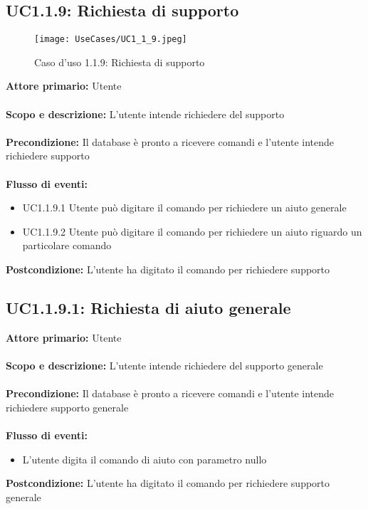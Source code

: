 \documentclass{scalatekids-article}
\begin{document}
\subsection{UC1.1.9: Richiesta di supporto}
\begin{figure}[H]
  \texttt{[image: UseCases/UC1\_1\_9.jpeg]}
  \caption{Caso d'uso 1.1.9: Richiesta di supporto}
\end{figure}
\textbf{Attore primario:} Utente \\ \\
\textbf{Scopo e descrizione:} L’utente intende richiedere del supporto\\ \\
\textbf{Precondizione:} Il database è pronto a ricevere comandi e l’utente intende richiedere supporto\\ \\
\textbf{Flusso di eventi:}
\begin{itemize}
\item UC1.1.9.1 Utente può digitare il comando per richiedere un aiuto generale
\item UC1.1.9.2 Utente può digitare il comando per richiedere un aiuto riguardo un particolare comando
\end{itemize}
\textbf{Postcondizione:} L’utente ha digitato il comando per richiedere supporto
\subsection{UC1.1.9.1: Richiesta di aiuto generale}
\textbf{Attore primario:} Utente \\ \\
\textbf{Scopo e descrizione:} L’utente intende richiedere del supporto generale\\ \\
\textbf{Precondizione:} Il database è pronto a ricevere comandi e l’utente intende richiedere supporto generale\\ \\
\textbf{Flusso di eventi:}
\begin{itemize}
\item L’utente digita il comando di aiuto con parametro nullo
\end{itemize}
\textbf{Postcondizione:} L’utente ha digitato il comando per richiedere supporto generale
\end{document}
